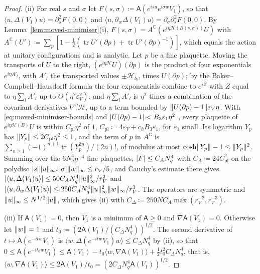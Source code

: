 \documentclass[11pt]{preprint}
\newcommand{\tr}{\operatorname{tr}}
\DeclarePairedDelimiter{\abs}{\lvert}{\rvert}
\DeclarePairedDelimiter{\norm}{\lVert}{\rVert}
\numberwithin{equation}{section}
\theoremstyle{definition}
\theoremstyle{remark}
\theoremstyle{plain}
\begin{document}
\begin{proof}
(ii) For real $s$ and $\sigma$ let $F(s, \sigma) \coloneqq \mathsf A(e^{isu}e^{i\sigma w}V_1)$, so that $\langle u, \Delta(V_1)u\rangle = \partial_s^2F(0, 0)$ and $\langle u, \partial_w\Delta(V_1)u\rangle = \partial_\sigma\partial_s^2F(0, 0)$. By Lemma~\ref{lem:moved-minimiser}(i), $F(s, \sigma) = A^{\mathbb C}(e^{i\eta\mathcal H(B(s,\sigma))}U)$ with $A^{\mathbb C}(U') \coloneqq \sum_p[1 - \frac12(\tr U'(\partial p) + \tr U'(\partial p)^{-1})]$, which equals the action at unitary configurations and is analytic. Let $p$ be a fine plaquette. Moving the transports of $U$ to the right, $(e^{i\eta\mathcal H}U)(\partial p)$ is the product of four exponentials $e^{i\eta A'_l}$, with $A'_l$ the transported values $\pm\mathcal H_{b_l}$, times $U(\partial p)$; by the Baker--Campbell--Hausdorff formula the four exponentials combine to $e^{iZ}$ with $Z$ equal to $\eta\sum_lA'_l$ up to $O(\eta^2\varepsilon_V^2)$, and $\eta\sum_lA'_l$ is $\eta^2$ times a combination of the covariant derivatives $\nabla^\eta\mathcal H$, up to a term bounded by $\norm{U(\partial p) - 1}\varepsilon_V\eta$. With \eqref{eq:moved-minimiser-bounds} and $\abs{U(\partial p) - 1} < B_3\varepsilon_1\eta^2$ \cite[Theorem~1]{BalabanVAR}, every plaquette of $e^{i\eta\mathcal H(B)}U$ is within $C_{\mathrm{pl}}\eta^2$ of $1$, $C_{\mathrm{pl}} \coloneqq 4\varepsilon_V + c_hB_3\varepsilon_1$, for $\varepsilon_1$ small. Its logarithm $Y_p$ has $\norm{Y_p} \leq 2C_{\mathrm{pl}}\eta^2 \leq 1$, and the term of $p$ in $A^{\mathbb C}$ is $\sum_{n \geq 1}(-1)^{n+1}\tr(Y_p^{2n})/(2n)!$, of modulus at most $\cosh\norm{Y_p} - 1 \leq \norm{Y_p}^2$. Summing over the $6N_q^4\eta^{-4}$ fine plaquettes, $\abs F \leq C_AN_q^4$ with $C_A \coloneqq 24C_{\mathrm{pl}}^2$ on the polydisc $\abs s\norm u_\infty, \abs\sigma\norm w_\infty \leq r_V/5$, and Cauchy's estimate there gives $\abs{\langle u, \Delta(V_1)u\rangle} \leq 50C_AN_q^4\norm u_\infty^2/r_V^2$ and $\abs{\langle u, \partial_w\Delta(V_1)u\rangle} \leq 250C_AN_q^4\norm u_\infty^2\norm w_\infty/r_V^3$. The operators are symmetric and $\norm u_\infty \leq N^{1/2}\norm u$, which gives (ii) with $C_\Delta \coloneqq 250NC_A\max(r_V^{-2}, r_V^{-3})$.

(iii) If $\mathsf A(V_1) = 0$, then $V_1$ is a minimum of $\mathsf A \geq 0$ and $\nabla\mathsf A(V_1) = 0$. Otherwise let $\norm w = 1$ and $t_0 \coloneqq (2\mathsf A(V_1)/(C_\Delta N_q^4))^{1/2}$. The second derivative of $t \mapsto \mathsf A(e^{-itw}V_1)$ is $\langle w, \Delta(e^{-itw}V_1)w\rangle \leq C_\Delta N_q^4$ by (ii), so that $0 \leq \mathsf A(e^{-it_0w}V_1) \leq \mathsf A(V_1) - t_0\langle w, \nabla\mathsf A(V_1)\rangle + \frac12t_0^2C_\Delta N_q^4$, that is, $\langle w, \nabla\mathsf A(V_1)\rangle \leq 2\mathsf A(V_1)/t_0 = (2C_\Delta N_q^4\mathsf A(V_1))^{1/2}$.
\end{proof}
\end{document}
